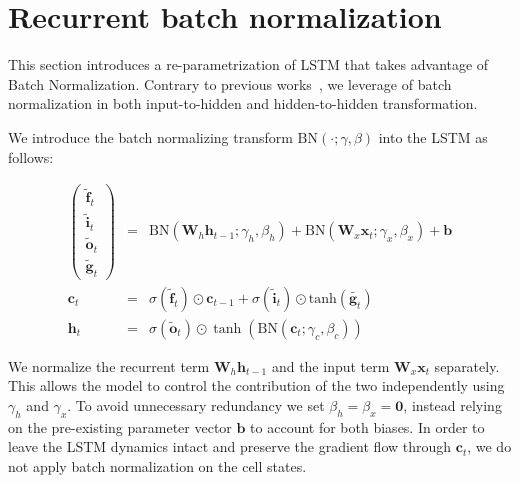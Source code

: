 \documentclass{article} %
\newcommand{\vect}[1]{\mathbf{#1}}
\newcommand{\mat}[1]{\mathbf{#1}}
\newcommand{\ewprod}{\odot}
\begin{document}
\section{Recurrent batch normalization}
\label{sec:recurrent-batch-normalization}

This section introduces a re-parametrization of LSTM that takes advantage
of Batch Normalization. Contrary to previous works~\cite{cesar, baidu}, we leverage of batch normalization in both input-to-hidden and hidden-to-hidden transformation.


We introduce the batch normalizing transform $\mathrm{BN}(\cdot; \gamma, \beta)$ into the LSTM as follows:

\begin{eqnarray}
\left(\begin{array}{ccc}
\tilde{\vect{f}}_t \\
\tilde{\vect{i}}_t \\
\tilde{\vect{o}}_t \\
\tilde{\vect{g}}_t
\end{array}\right)
 &=&
 \mathrm{BN} (\mat{W}_h \vect{h}_{t-1}; \gamma_h, \beta_h) +
 \mathrm{BN} (\mat{W}_x \vect{x}_t    ; \gamma_x, \beta_x) +
 \vect{b}
\\
\vect{c}_t &=& \sigma(\tilde{\vect{f}}_t) \ewprod \vect{c}_{t-1} +
              \sigma(\tilde{\vect{i}}_t) \ewprod \mathrm{tanh}(\tilde{\vect{g}_t}) \\
\vect{h}_t &=& \sigma(\tilde{\vect{o}}_t) \ewprod \tanh(
 \mathrm{BN} (\vect{c}_t; \gamma_c, \beta_c)
)
\end{eqnarray}


We normalize the recurrent term $\mat{W}_h \vect{h}_{t-1}$ and the input term $\mat{W}_x \vect{x}_t$ separately.
This allows the model to control the contribution of the two independently using $\gamma_h$ and $\gamma_x$.
To avoid unnecessary redundancy we set $\beta_h = \beta_x = \vect{0}$, instead relying on the pre-existing parameter vector $\vect{b}$ to account for both biases.
In order to leave the LSTM dynamics intact and preserve the gradient flow through $\vect{c}_t$, we do not apply batch normalization on the cell states.
\end{document}
